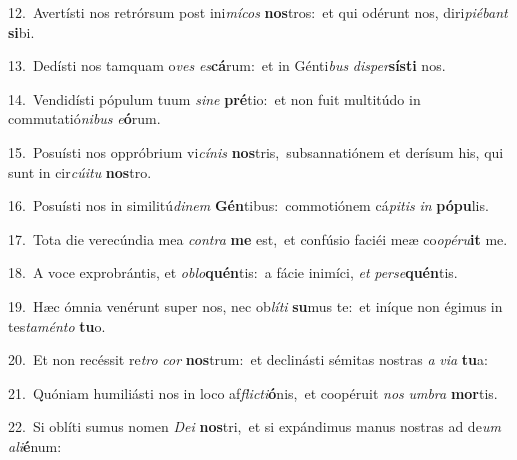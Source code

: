 {\numbfont\textcolor{\numbcolor}{12.}}~Avertísti nos retrórsum post ini\-\textit{mí}\-\textit{cos} \textbf{nos}\-tros:~\star et qui odérunt nos, diri\-\textit{pi}\-\textit{é}\textit{bant} \textbf{si}\-bi.\par
{\numbfont\textcolor{\numbcolor}{13.}}~Dedísti nos tamquam o\textit{ves} \textit{es}\-\textbf{cá}rum:~\star et in Génti\textit{bus} \textit{di}\-\textit{sper}\textbf{sís}\textbf{ti} nos.\par
{\numbfont\textcolor{\numbcolor}{14.}}~Vendidísti pópulum tuum \textit{si}\-\textit{ne} \textbf{pré}\-tio:~\star et non fuit multitúdo in commutatió\-\textit{ni}\-\textit{bus} \textit{e}\-\textbf{ó}rum.\par
{\numbfont\textcolor{\numbcolor}{15.}}~Posuísti nos oppróbrium vi\-\textit{cí}\-\textit{nis} \textbf{nos}\-tris,~\star subsannatiónem et derísum his, qui sunt in cir\-\textit{cú}\-\textit{i}\textit{tu} \textbf{nos}\-tro.\par
{\numbfont\textcolor{\numbcolor}{16.}}~Posuísti nos in similitú\-\textit{di}\-\textit{nem} \textbf{Gén}\-tibus:~\star commotiónem cá\-\textit{pi}\-\textit{tis} \textit{in} \textbf{pó}\-\textbf{pu}lis.\par
{\numbfont\textcolor{\numbcolor}{17.}}~Tota die verecúndia mea \textit{con}\-\textit{tra} \textbf{me} est,~\star et confúsio faciéi meæ co\-\textit{o}\-\textit{pé}\textit{ru}\textbf{it} me.\par
{\numbfont\textcolor{\numbcolor}{18.}}~A voce exprobrántis, et \textit{ob}\-\textit{lo}\textbf{quén}tis:~\star a fácie inimíci, \textit{et} \textit{per}\-\textit{se}\textbf{quén}tis.\par
{\numbfont\textcolor{\numbcolor}{19.}}~Hæc ómnia venérunt super nos, nec ob\-\textit{lí}\-\textit{ti} \textbf{su}\-mus te:~\star et iníque non égimus in tes\-\textit{ta}\-\textit{mén}\textit{to} \textbf{tu}\-o.\par
{\numbfont\textcolor{\numbcolor}{20.}}~Et non recéssit re\textit{tro} \textit{cor} \textbf{nos}\-trum:~\star et declinásti sémitas nostras \textit{a} \textit{vi}\-\textit{a} \textbf{tu}\-a:\par
{\numbfont\textcolor{\numbcolor}{21.}}~Quóniam humiliásti nos in loco af\-\textit{flic}\-\textit{ti}\textbf{ó}nis,~\star et coopéruit \textit{nos} \textit{um}\-\textit{bra} \textbf{mor}\-tis.\par
{\numbfont\textcolor{\numbcolor}{22.}}~Si oblíti sumus nomen \textit{De}\-\textit{i} \textbf{nos}\-tri,~\star et si expándimus manus nostras ad de\textit{um} \textit{a}\-\textit{li}\textbf{é}num:\par
